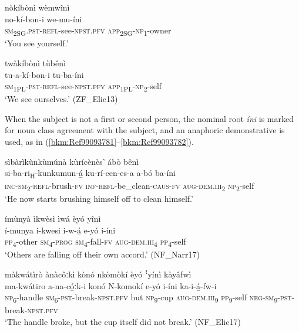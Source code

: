 \ea
nòkíbònì wèmwînì\\
\gll no-kí-bon-i        we-mu-íni\\
\textsc{sm}\textsubscript{2SG}.\textsc{pst}-\textsc{refl}-see-\textsc{npst}.\textsc{pfv}  \textsc{app}\textsubscript{2SG}-\textsc{np}\textsubscript{1}-owner\\
\glt ‘You see yourself.’
\z

\ea
\label{bkm:Ref492039233}
twàkíbònì tùbênì\\
\gll tu-a-kí-bon-i      tu-ba-íni\\
\textsc{sm}\textsubscript{1PL}-\textsc{pst}-\textsc{refl}-see-\textsc{npst}.\textsc{pfv}  \textsc{app}\textsubscript{1PL}-\textsc{np}\textsubscript{2}-self\\
\glt ‘We see ourselves.’ (ZF\_Elic13)
\z

When the subject is not a first or second person, the nominal root \textit{íni} is marked for noun class agreement with the subject, and an anaphoric demonstrative is used, as in (\ref{bkm:Ref99093781}--\ref{bkm:Ref99093782}).

\ea
\label{bkm:Ref99093781}
sìbàrìkùnkùmúnà kùrícènès’ ábò bênì\\
\gll si-ba-ri\textsubscript{H}-kunkumun-á̲  ku-rí-cen-es-a a-bó    ba-íni\\
\textsc{inc}-\textsc{sm}\textsubscript{2}-\textsc{refl}-brush-\textsc{fv}  \textsc{inf}-\textsc{refl}-be\_clean-\textsc{caus}-\textsc{fv}
\textsc{aug}-\textsc{dem}.\textsc{iii}\textsubscript{2}  \textsc{np}\textsubscript{2}-self\\
\glt ‘He now starts brushing himself off to clean himself.’
\z

\ea
ímùnyà ìkwèsì ìwá èyó yînì\\
\gll í-munya  i-kwesi  i-w-á̲    e-yó    i-íni\\
\textsc{pp}\textsubscript{4}-other  \textsc{sm}\textsubscript{4}\--\textsc{prog}  \textsc{sm}\textsubscript{4}-fall-\textsc{fv}  \textsc{aug}-\textsc{dem}.\textsc{iii}\textsubscript{4}  \textsc{pp}\textsubscript{4}-self\\
\glt ‘Others are falling off their own accord.’ (NF\_Narr17)
\z

\ea
\label{bkm:Ref99093782}
màkwátìrò ànàcôːkì kònó nkòmòkí èyó ꜝyínì kàyâfwì\\
\gll ma-kwátiro  a-na-có̲ːk-i konó  N-komokí  e-yó    i-íni    ka-i-á̲-fw-i\\
\textsc{np}\textsubscript{6}-handle  \textsc{sm}\textsubscript{6}-\textsc{pst}-break-\textsc{npst}.\textsc{pfv}
but  \textsc{np}\textsubscript{9}-cup  \textsc{aug}-\textsc{dem}.\textsc{iii}\textsubscript{9}  \textsc{pp}\textsubscript{9}-self  \textsc{neg}-\textsc{sm}\textsubscript{9}-\textsc{pst}-break-\textsc{npst}.\textsc{pfv}\\
\glt ‘The handle broke, but the cup itself did not break.’ (NF\_Elic17)
\z

